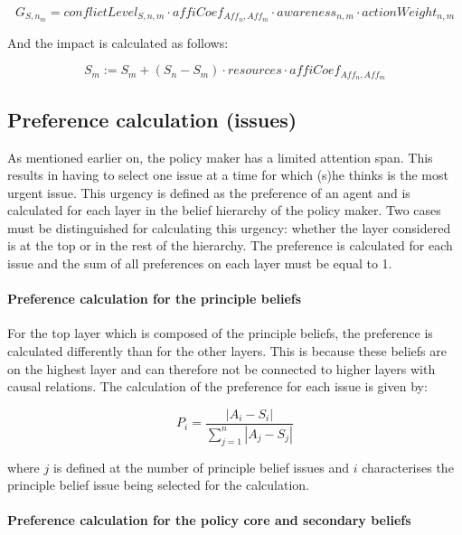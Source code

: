 \begin{equation}\label{eq:likelihoodStateChange}
G_{S, n_m} = conflictLevel_{S, n,m} \cdot affiCoef_{Aff_n,Aff_m} \cdot awareness_{n,m} \cdot actionWeight_{n,m}
\end{equation}

And the impact is calculated as follows:

\begin{equation}\label{eq:impactStateChange}
S_{m} := S_{m} + \left(S_{n} - S_{m} \right) \cdot resources \cdot affiCoef_{Aff_n,Aff_m}
\end{equation}

\subsection{Preference calculation (issues)}

As mentioned earlier on, the policy maker has a limited attention span. This results in having to select one issue at a time for which (s)he thinks is the most urgent issue. This urgency is defined as the preference of an agent and is calculated for each layer in the belief hierarchy of the policy maker. Two cases must be distinguished for calculating this urgency: whether the layer considered is at the top or in the rest of the hierarchy. The preference is calculated for each issue and the sum of all preferences on each layer must be equal to 1.

\paragraph{Preference calculation for the principle beliefs}

For the top layer which is composed of the principle beliefs, the preference is calculated differently than for the other layers. This is because these beliefs are on the highest layer and can therefore not be connected to higher layers with causal relations. The calculation of the preference for each issue is given by:

\begin{equation}
P_i = \frac{ |A_i - S_i|}{\sum_{j=1}^n |A_j - S_j|}
\end{equation}

where $j$ is defined at the number of principle belief issues and $i$ characterises the principle belief issue being selected for the calculation.

\paragraph{Preference calculation for the policy core and secondary beliefs}

